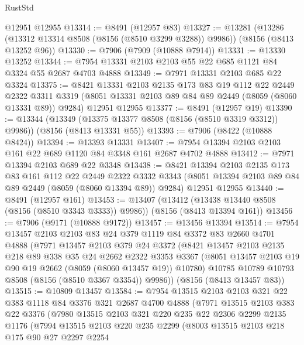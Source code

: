 \begin{lexlean}{RustStd}
\begin{coremodule}
{\begin{coremodule}
{{{{{{{{{{{{{{{{{{{{{{{{{{{{{{{{{{    @12951
    @12955
@13314 := @8491 (@12957 @83)
@13327 := @13281
    (@13286 (@13312 @13314 @8508 (@8156 (@8510 @3299 @3288)) @9986))
    (@8156 (@8413 @13252 @96))
@13330 := @7906 (@7909 (@10888 @7914))
@13331 := @13330 @13252
@13344 := @7954 @13331 @2103 @2103 @55 @22 @685 @1121 @84 @3324 @55 @2687 @4703 @4888
@13349 := @7971 @13331 @2103 @685 @22 @3324
@13375 := @8421
    @13331
    @2103
    @2135
    @173
    @83
    @19
    @112
    @22
    @2449
    @2322
    @3311
    @3319
    (@8051 @13331 @2103 @89 @84 @89 @2449 (@8059 (@8060 @13331 @89)) @9284)
    @12951
    @12955
@13377 := @8491 (@12957 @19)
@13390 := @13344
    (@13349 (@13375 @13377 @8508 (@8156 (@8510 @3319 @3312)) @9986))
    (@8156 (@8413 @13331 @55))
@13393 := @7906 (@8422 (@10888 @8424))
@13394 := @13393 @13331
@13407 := @7954 @13394 @2103 @2103 @161 @22 @689 @1120 @84 @3348 @161 @2687 @4702 @4888
@13412 := @7971 @13394 @2103 @689 @22 @3348
@13438 := @8421
    @13394
    @2103
    @2135
    @173
    @83
    @161
    @112
    @22
    @2449
    @2322
    @3332
    @3343
    (@8051 @13394 @2103 @89 @84 @89 @2449 (@8059 (@8060 @13394 @89)) @9284)
    @12951
    @12955
@13440 := @8491 (@12957 @161)
@13453 := @13407
    (@13412 (@13438 @13440 @8508 (@8156 (@8510 @3343 @3333)) @9986))
    (@8156 (@8413 @13394 @161))
@13456 := @7906 (@9171 (@10888 @9172))
@13457 := @13456 @13394
@13514 := @7954
    @13457
    @2103
    @2103
    @83
    @24
    @379
    @1119
    @84
    @3372
    @83
    @2660
    @4701
    @4888
    (@7971
      @13457
      @2103
      @379
      @24
      @3372
      (@8421
        @13457
        @2103
        @2135
        @218
        @89
        @338
        @35
        @24
        @2662
        @2322
        @3353
        @3367
        (@8051 @13457 @2103 @19 @90 @19 @2662 (@8059 (@8060 @13457 @19)) @10780)
        @10785
        @10789
        @10793
        @8508
        (@8156 (@8510 @3367 @3354))
        @9986))
    (@8156 (@8413 @13457 @83))
@13515 := @10809 @13457
@13584 := @7954
    @13515
    @2103
    @2103
    @321
    @22
    @383
    @1118
    @84
    @3376
    @321
    @2687
    @4700
    @4888
    (@7971
      @13515
      @2103
      @383
      @22
      @3376
      (@7980
        @13515
        @2103
        @321
        @220
        @235
        @22
        @2306
        @2299
        @2135
        @1176
        (@7994
          @13515
          @2103
          @220
          @235
          @2299
          (@8003
            @13515
            @2103
            @218
            @175
            @90
            @27
            @2297
            @2254
}}}}}}}}}}}}}}}}}}}}}}}}}}}}}}}}}}
\end{coremodule}}
\end{coremodule}
\end{lexlean}
